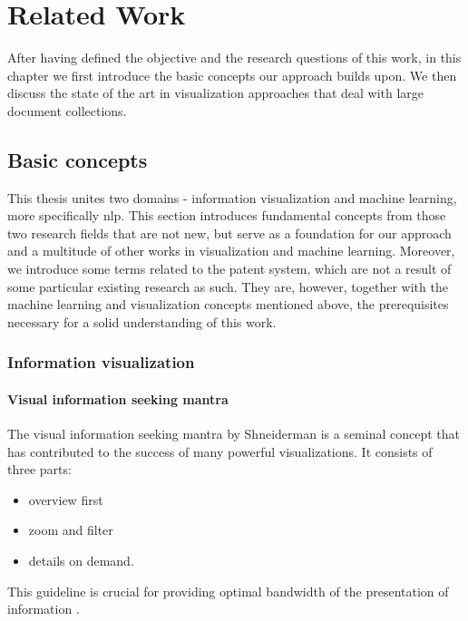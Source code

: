 
\chapter{Related Work}
\label{ch:related_work}

After having defined the objective and the research questions of this work, in this chapter we first introduce the basic concepts our approach builds upon.
We then discuss the state of the art in visualization approaches that deal with large document collections.

\section{Basic concepts}
\label{sec:basic_concepts}

This thesis unites two domains - information visualization and machine learning, more specifically \gls{nlp}.
This section introduces fundamental concepts from those two research fields that are not new, but serve as a foundation for our approach and a multitude of other works in visualization and machine learning.
Moreover, we introduce some terms related to the patent system, which are not a result of some particular existing research as such.
They are, however, together with the machine learning and visualization concepts mentioned above, the prerequisites necessary for a solid understanding of this work.

\subsection{Information visualization}
\label{subsec:information_visualization}

\subsubsection{Visual information seeking mantra}
\label{subsubsec:visual_information_seeking_mantra}

The visual information seeking mantra by Shneiderman \cite{Shneiderman1996} is a seminal concept that has contributed to the success of many powerful visualizations. It consists of three parts:
\begin{itemize}
\item overview first
\item zoom and filter
\item details on demand.
\end{itemize}
This guideline is crucial for providing optimal bandwidth of the presentation of information .

